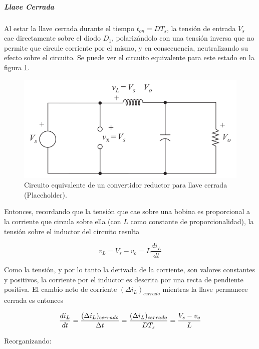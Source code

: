 \subparagraph{Llave Cerrada}

Al estar la llave cerrada durante el tiempo $t_{on} = DT_s$, la tensión de entrada $V_s$ cae directamente sobre el diodo $D_1$, polarizándolo con una tensión inversa que no permite que circule corriente por el mismo, y en consecuencia, neutralizando su efecto sobre el circuito. Se puede ver el circuito equivalente para este estado en la figura \ref{reductor_llave_cerrada}.

\begin{figure}[H]
    \centering
    \includegraphics[scale=0.4]{Imagenes/Reductor Llave Cerrada.png}
    \caption{Circuito equivalente de un convertidor reductor para llave cerrada  (Placeholder).}
    \label{reductor_llave_cerrada}
\end{figure}

Entonces, recordando que la tensión que cae sobre una bobina es proporcional a la corriente que circula sobre ella (con $L$ como constante de proporcionalidad), la tensión sobre el inductor del circuito resulta

\begin{equation}\label{ec_tensionL_cerrada}
    v_L = V_s - v_o = L\frac{di_L}{dt}
\end{equation}

Como la tensión, y por lo tanto la derivada de la corriente, son valores constantes y positivos, la corriente por el inductor es descrita por una recta de pendiente positiva. El cambio neto de corriente $(\Delta i_L)_{cerrado}$ mientras la llave permanece cerrada es entonces

\begin{equation*}
    \frac{di_L}{dt} = \frac{(\Delta i_L)_{cerrado}}{\Delta t} = \frac{(\Delta i_L)_{cerrado}}{DT_s} = \frac{V_s - v_o}{L}\\
\end{equation*}

Reorganizando:

